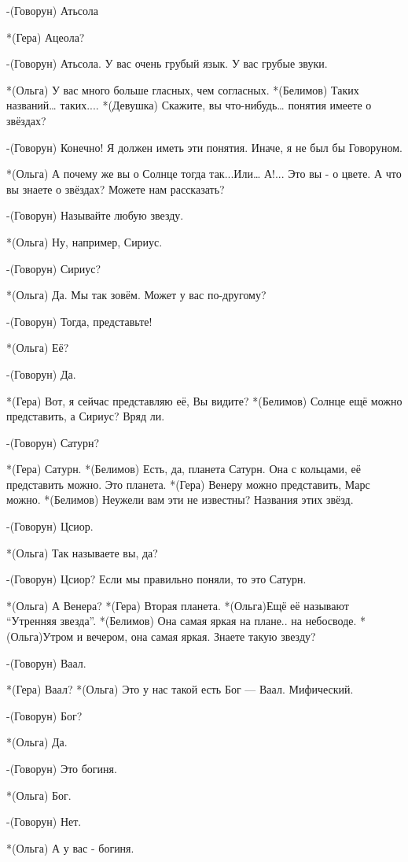 -(Говорун) Атьсола

*(Гера) Ацеола?

-(Говорун) Атьсола. У вас очень грубый язык. У вас грубые звуки.

*(Ольга) У вас много больше гласных, чем согласных.
*(Белимов) Таких названий… таких....
*(Девушка) Скажите, вы что-нибудь… понятия имеете о звёздах?

-(Говорун) Конечно! Я должен иметь эти понятия. Иначе, я не был бы Говоруном.

*(Ольга) А почему же вы о Солнце тогда так...Или… А!... Это вы - о цвете. А что вы знаете о звёздах? Можете нам рассказать?

-(Говорун) Называйте любую звезду.

*(Ольга) Ну, например, Сириус.

-(Говорун) Сириус?

*(Ольга) Да. Мы так зовём. Может у вас по-другому?

-(Говорун) Тогда, представьте! 

*(Ольга) Её?

-(Говорун) Да.

*(Гера) Вот, я сейчас представляю её, Вы видите?
*(Белимов) Солнце ещё можно представить, а Сириус? Вряд ли.

-(Говорун) Сатурн?

*(Гера) Сатурн.
*(Белимов) Есть, да, планета Сатурн. Она с кольцами, её представить можно. Это планета.
*(Гера) Венеру можно представить, Марс можно.
*(Белимов) Неужели вам эти не известны? Названия этих звёзд.

-(Говорун) Цсиор.

*(Ольга) Так называете вы, да?

-(Говорун) Цсиор? Если мы правильно поняли, то это Сатурн.

*(Ольга) А Венера? 
*(Гера) Вторая планета.
*(Ольга)Ещё её называют “Утренняя звезда”.
*(Белимов) Она самая яркая на плане.. на небосводе.
*(Ольга)Утром и вечером, она самая яркая. Знаете такую звезду?

-(Говорун) Ваал. 

*(Гера) Ваал?
*(Ольга) Это у нас такой есть Бог — Ваал. Мифический.

-(Говорун) Бог?

*(Ольга) Да.

-(Говорун) Это богиня.

*(Ольга) Бог.

-(Говорун) Нет. 

*(Ольга) А у вас - богиня.


